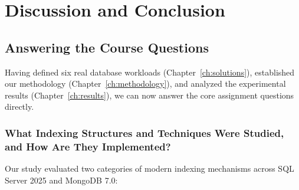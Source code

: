\chapter{Discussion and Conclusion}
\label{ch:conclusion}

\section{Answering the Course Questions}
Having defined six real database workloads (Chapter~\ref{ch:solutions}), established our methodology (Chapter~\ref{ch:methodology}), and analyzed the experimental results (Chapter~\ref{ch:results}), we can now answer the core assignment questions directly.

\subsection{What Indexing Structures and Techniques Were Studied, and How Are They Implemented?}
Our study evaluated two categories of modern indexing mechanisms across SQL Server 2025 and MongoDB 7.0:
